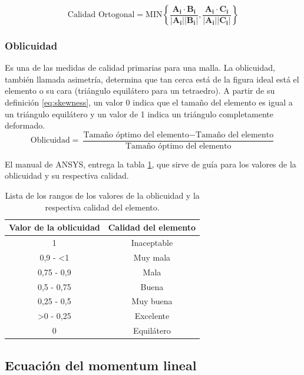 \begin{equation} \label{eq:cal_ort}
	\text{Calidad Ortogonal} = \text{MIN}\left\lbrace \frac{\mathbf{A_i}\cdot \mathbf{B_i}}{|\mathbf{A_i}||\mathbf{B_i}|} , \frac{\mathbf{A_i}\cdot \mathbf{C_i}}{|\mathbf{A_i}||\mathbf{C_i}|} \right\rbrace
\end{equation}

\subsubsection{Oblicuidad}
Es una de las medidas de calidad primarias para una malla. La oblicuidad, también llamada asimetría, determina que tan cerca está de la figura ideal está el elemento o su cara (triángulo equilátero para un tetraedro). A partir de su definición \ref{eq:skewness}, un valor 0 indica que el tamaño del elemento es igual a un triángulo equilátero y un valor de 1 indica un triángulo completamente deformado. 
\begin{equation} \label{eq:skewness}
	\text{Oblicuidad} = \frac{\text{Tamaño óptimo del elemento} - \text{Tamaño del elemento}}{\text{Tamaño óptimo del elemento}}
\end{equation}

El manual de ANSYS, entrega la tabla \ref{tab:skewness}, que sirve de guía para los valores de la oblicuidad y su respectiva calidad.

\begin{table}[]
\centering
\begin{tabular}{@{}cc@{}}
\toprule
Valor de la oblicuidad & Calidad del elemento \\ \midrule
1 & Inaceptable \\
0,9 - <1 & Muy mala \\
0,75 - 0,9 & Mala \\
0,5 - 0,75 & Buena \\
0,25 - 0,5 & Muy buena \\
>0 - 0,25 & Excelente \\
0 & Equilátero \\ \bottomrule
\end{tabular}
\caption{Lista de los rangos de los valores de la oblicuidad y la respectiva calidad del elemento. \cite{sharcnet_2017}}
\label{tab:skewness}
\end{table}

\newpage

\subsection{Ecuación del momentum lineal}

